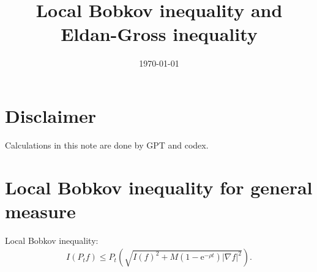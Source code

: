 \documentclass[11pt]{article}
\title{Local Bobkov inequality and Eldan-Gross inequality}
\date{\today}
\theoremstyle{plain}
\theoremstyle{definition}
\theoremstyle{remark}
\newcommand{\grad}{\nabla}
\newcommand{\e}{\mathrm{e}}
\newcommand{\tuple}[1]{\left(#1\right)}
\newcommand{\tp}{\tuple}
\newcommand{\abs}[1]{\left\vert#1\right\vert}
\begin{document}
\maketitle

\section*{Disclaimer}
Calculations in this note are done by GPT and codex.

\section{Local Bobkov inequality for general measure}

Local Bobkov inequality:
\begin{align*}
    I(P_t f) \le P_t \tp{\sqrt{I(f)^2 + M (1-\e^{-\rho t}) \abs{\grad f}^2}}.
\end{align*}
\end{document}
